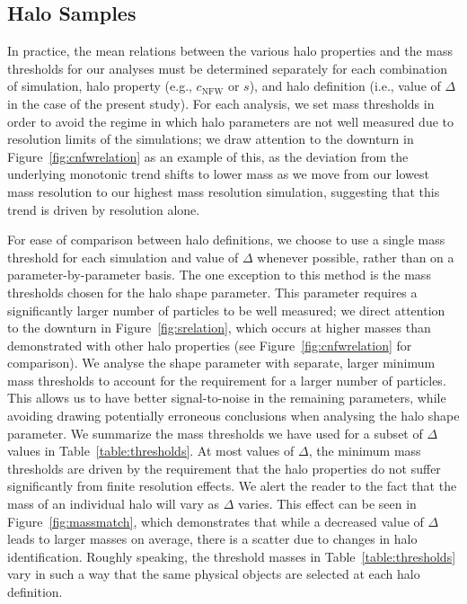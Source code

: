 \documentclass[usenatbib,fleqn]{mnras}
\begin{document}
\subsection{Halo Samples}

In practice, the mean relations between the various halo properties and the mass 
thresholds for our analyses must be determined separately for each combination of simulation, 
halo property (e.g., $c_{\mathrm{NFW}}$ or $s$), and halo definition (i.e., value of $\Delta$ in the case of the present study). 
For each analysis, we set mass thresholds in order to avoid the regime in which 
halo parameters are not well measured due to resolution limits of the simulations; 
we draw attention to the downturn in Figure~\ref{fig:cnfwrelation} as an example of this, 
as the deviation from the underlying monotonic trend shifts to lower mass as we move from our lowest mass resolution to our highest mass resolution simulation, suggesting that this trend is driven by resolution alone.


For ease of comparison between halo definitions, we choose to use a single mass threshold for each
simulation and value of $\Delta$ whenever possible, rather than on a parameter-by-parameter basis. 
The one exception to this method is the mass thresholds chosen
for the halo shape parameter. This parameter requires a significantly larger number of particles to be
well measured; we direct attention to the downturn in Figure~\ref{fig:srelation}, which occurs at
higher masses than demonstrated with other halo properties (see Figure~\ref{fig:cnfwrelation}
for comparison). We analyse the shape parameter with separate, larger minimum mass thresholds to account for 
the requirement for a larger number of particles. This allows us
to have better signal-to-noise in the remaining parameters, while avoiding drawing potentially
erroneous conclusions when analysing the halo shape parameter.
We summarize the mass thresholds we have used for a 
subset of $\Delta$ values in Table~\ref{table:thresholds}. 
At most values of $\Delta$, the minimum mass thresholds are 
driven by the requirement that the halo properties do 
not suffer significantly from finite resolution effects. We alert the reader to the fact 
that the mass of an individual halo will vary as $\Delta$ varies. This effect can be seen in Figure~\ref{fig:massmatch}, which demonstrates that while a decreased value of $\Delta$ leads to larger masses on average, there is a scatter due to changes in halo identification. Roughly speaking, 
the threshold masses in Table~\ref{table:thresholds} vary in such a way that the 
same physical objects are selected at each halo definition.
\end{document}
